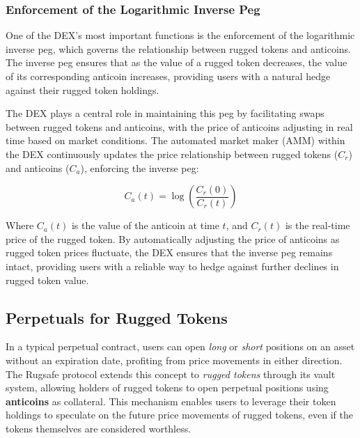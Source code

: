\documentclass{article}
\begin{document}
\subsubsection{Enforcement of the Logarithmic Inverse Peg}

One of the DEX’s most important functions is the enforcement of the logarithmic inverse peg, which governs the relationship between rugged tokens and anticoins. The inverse peg ensures that as the value of a rugged token decreases, the value of its corresponding anticoin increases, providing users with a natural hedge against their rugged token holdings.

The DEX plays a central role in maintaining this peg by facilitating swaps between rugged tokens and anticoins, with the price of anticoins adjusting in real time based on market conditions. The automated market maker (AMM) within the DEX continuously updates the price relationship between rugged tokens ($C_r$) and anticoins ($C_a$), enforcing the inverse peg:

\[
C_{a}(t) = \log\left(\frac{C_{r}(0)}{C_{r}(t)}\right)
\]

Where \( C_{a}(t) \) is the value of the anticoin at time \( t \), and \( C_{r}(t) \) is the real-time price of the rugged token. By automatically adjusting the price of anticoins as rugged token prices fluctuate, the DEX ensures that the inverse peg remains intact, providing users with a reliable way to hedge against further declines in rugged token value.





\subsection{Perpetuals for Rugged Tokens}

In a typical perpetual contract, users can open \textit{long} or \textit{short} positions on an asset without an expiration date, profiting from price movements in either direction. The Rugsafe protocol extends this concept to \textit{rugged tokens} through its vault system, allowing holders of rugged tokens to open perpetual positions using \textbf{anticoins} as collateral. This mechanism enables users to leverage their token holdings to speculate on the future price movements of rugged tokens, even if the tokens themselves are considered worthless.
\end{document}
